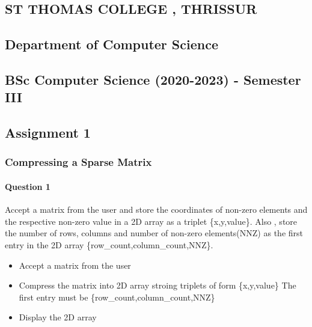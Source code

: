 \documentclass[
]{article}
\author{}
\date{}
\begin{document}
\begin{center}
\hypertarget{st-thomas-college-thrissur}{%
\subsection{ST THOMAS COLLEGE ,
THRISSUR}\label{st-thomas-college-thrissur}}

\hypertarget{department-of-computer-science}{%
\subsection{Department of Computer
Science}\label{department-of-computer-science}}

\hypertarget{bsc-computer-science-2020-2023---semester-iii}{%
\subsection{BSc Computer Science (2020-2023) - Semester
III}\label{bsc-computer-science-2020-2023---semester-iii}}
\end{center}
\*
\hypertarget{assignment-1}{%
\subsection{Assignment 1}\label{assignment-1}}

\hypertarget{compressing-a-sparse-matrix}{%
\subsubsection{Compressing a Sparse
Matrix}\label{compressing-a-sparse-matrix}}

\hypertarget{question-1}{%
\paragraph{Question 1}\label{question-1}}

Accept a matrix from the user and store the coordinates of non-zero
elements and the respective non-zero value in a 2D array as a triplet
\{x,y,value\}. Also , store the number of rows, columns and number of
non-zero elements(NNZ) as the first entry in the 2D array
\{row\_count,column\_count,NNZ\}.

\begin{itemize}
\item
  Accept a matrix from the user
\item
  Compress the matrix into 2D array stroing triplets of form
  \{x,y,value\} The first entry must be \{row\_count,column\_count,NNZ\}
\item
  Display the 2D array
\end{itemize}
\end{document}
